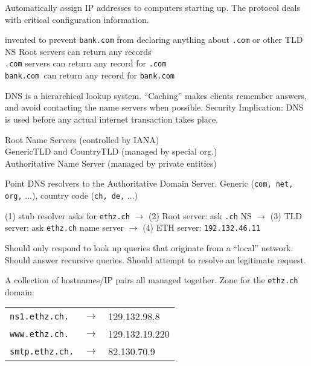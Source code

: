  Automatically assign IP addresses to computers starting up. The protocol deals with critical configuration information.

invented to prevent {\tt bank.com} from declaring anything about {\tt .com} or other TLD NS
Root servers can return any records\\
{\tt .com} servers can return any record for {\tt .com} \\
{\tt bank.com }can return any record for {\tt bank.com}

 DNS is a hierarchical lookup system. ``Caching'' makes clients remember answers, and avoid contacting the name servers when possible. Security Implication: DNS is used before any actual internet transaction takes place.

Root Name Servers (controlled by IANA) \\
GenericTLD and CountryTLD (managed by special org.) \\
Authoritative Name Server (managed by private entities)

 Point DNS resolvers to the Authoritative Domain Server. Generic ({\tt com, net, org,} ...), country code ({\tt ch, de,} ...)

(1) stub resolver asks for {\tt ethz.ch} $\to$ (2) Root server: ask {\tt .ch} NS $\to$ (3) TLD server: ask {\tt ethz.ch} name server $\to$ (4) ETH server: {\tt 192.132.46.11}

 Should only respond to look up queries that originate from a ``local'' network. Should answer recursive queries. Should attempt to resolve an legitimate request.

 A collection of hostnames/IP pairs all managed together. Zone for the {\tt ethz.ch} domain:

\begin{tabular}{lcl}
{\tt ns1.ethz.ch.} & $\to$ & 129.132.98.8 \\
{\tt www.ethz.ch.} & $\to$ & 129.132.19.220 \\
{\tt smtp.ethz.ch.} & $\to$ & 82.130.70.9 \\
\end{tabular}

